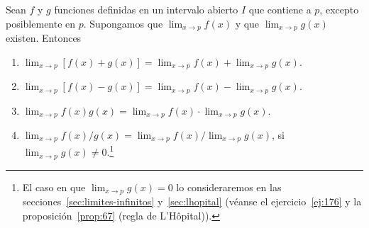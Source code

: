 \documentclass[12pt,a4paper]{book}
\begin{document}
    \begin{proposicion}\label{prop:36}
        Sean $f$ y $g$ funciones definidas en
        un intervalo abierto $I$ que contiene a $p$, excepto posiblemente en $p$. Supongamos
        que $\lim_{x\to p}f(x)$ y que $\lim_{x\to p}g(x)$ existen. Entonces
        \begin{enumerate}[nosep]
            \item $\displaystyle\lim_{x\to p}[f(x)+g(x)]=\lim_{x\to p}f(x)+\lim_{x\to p}g(x)$.
            \item $\displaystyle\lim_{x\to p}[f(x)-g(x)]=\lim_{x\to p}f(x)-\lim_{x\to p}g(x)$.
            \item $\displaystyle\lim_{x\to p}f(x)g(x)=\lim_{x\to p}f(x)\cdot\lim_{x\to p}g(x)$.
            \item $\displaystyle\lim_{x\to p}f(x)/g(x)=\lim_{x\to p}f(x)/\lim_{x\to p}g(x)$, si $\displaystyle\lim_{x\to p}g(x)\neq 0$.\footnote{El caso en que $\lim_{x\to p}g(x)=0$ lo consideraremos en las secciones~\ref{sec:limites-infinitos} y~\ref{sec:lhopital} (véanse el
            ejercicio~\ref{ej:176} y la proposición~\ref{prop:67} (regla de L'Hôpital)).}
        \end{enumerate}
    \end{proposicion}
\end{document}
